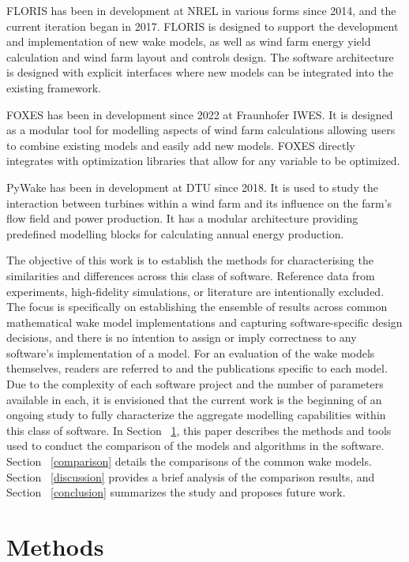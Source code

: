 \documentclass{iopconfser}
\newcommand{\ind}[]{\hspace{6mm}}
\begin{document}
\ind{}FLORIS has been in development at NREL in various forms since 2014, and the current iteration began in 2017.
FLORIS is designed to support the development and implementation of new wake models, as well as wind farm energy yield calculation and wind farm layout and controls design.
The software architecture is designed with explicit interfaces where new models can be integrated into the existing framework.

\ind{}FOXES has been in development since 2022 at Fraunhofer IWES.
It is designed as a modular tool for modelling aspects of wind farm calculations allowing users to combine existing models and easily add new models.
FOXES directly integrates with optimization libraries that allow for any variable to be optimized.

\ind{}PyWake has been in development at DTU since 2018.
It is used to study the interaction between turbines within a wind farm and its influence on the farm’s flow field and power production.
It has a modular architecture providing predefined modelling blocks for calculating annual energy production.

\ind{}The objective of this work is to establish the methods for characterising the similarities and differences across this class of software.
Reference data from experiments, high-fidelity simulations, or literature are intentionally excluded.
The focus is specifically on establishing the ensemble of results across common mathematical wake model implementations and capturing software-specific design decisions, and there is no intention to assign or imply correctness to any software’s implementation of a model.
For an evaluation of the wake models themselves, readers are referred to \cite{porteagel2020wind} and the publications specific to each model.
Due to the complexity of each software project and the number of parameters available in each, it is envisioned that the current work is the beginning of an ongoing study to fully characterize the aggregate modelling capabilities within this class of software.
In Section ~\ref{methods}, this paper describes the methods and tools used to conduct the comparison of the models and algorithms in the software.
Section ~\ref{comparison} details the comparisons of the common wake models.
Section ~\ref{discussion} provides a brief analysis of the comparison results, and Section ~\ref{conclusion} summarizes the study and proposes future work.

\section{Methods} \label{methods}
\end{document}
